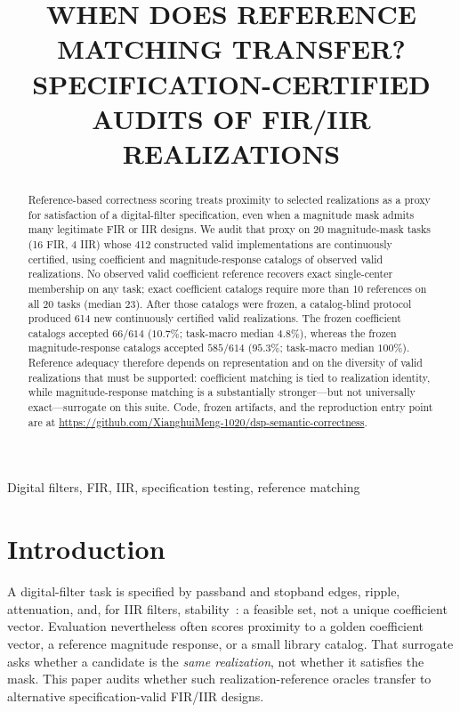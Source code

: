 \documentclass{article}
\title{WHEN DOES REFERENCE MATCHING TRANSFER? SPECIFICATION-CERTIFIED\\
AUDITS OF FIR/IIR REALIZATIONS}
\begin{document}
\maketitle

\begin{abstract}
Reference-based correctness scoring treats proximity to selected
realizations as a proxy for satisfaction of a digital-filter
specification, even when a magnitude mask admits many legitimate
FIR or IIR designs.
We audit that proxy on 20 magnitude-mask tasks (16 FIR, 4 IIR)
whose 412 constructed valid implementations are continuously
certified, using coefficient and magnitude-response catalogs of
observed valid realizations.
No observed valid coefficient reference recovers exact
single-center membership on any task; exact coefficient catalogs
require more than 10 references on all 20 tasks (median 23).
After those catalogs were frozen, a catalog-blind protocol produced
614 new continuously certified valid realizations.
The frozen coefficient catalogs accepted $66/614$ ($10.7\%$;
task-macro median $4.8\%$), whereas the frozen magnitude-response
catalogs accepted $585/614$ ($95.3\%$; task-macro median $100\%$).
Reference adequacy therefore depends on representation and on the
diversity of valid realizations that must be supported:
coefficient matching is tied to realization identity, while
magnitude-response matching is a substantially stronger---but not
universally exact---surrogate on this suite.
Code, frozen artifacts, and the reproduction entry point are at
\url{https://github.com/XianghuiMeng-1020/dsp-semantic-correctness}.
\end{abstract}

\begin{keywords}
Digital filters, FIR, IIR, specification testing, reference matching
\end{keywords}

\section{Introduction}
\label{sec:intro}

A digital-filter task is specified by passband and stopband
edges, ripple, attenuation, and, for IIR filters,
stability~\cite{oppenheim2010dsp,proakis2007dsp,rabiner1975theory,mitra2011dsp}:
a feasible set, not a unique coefficient vector.
Evaluation nevertheless often scores proximity to a golden
coefficient vector, a reference magnitude response, or a small
library catalog.
That surrogate asks whether a candidate is the \emph{same
realization}, not whether it satisfies the mask.
This paper audits whether such realization-reference oracles
transfer to alternative specification-valid FIR/IIR designs.
\end{document}
